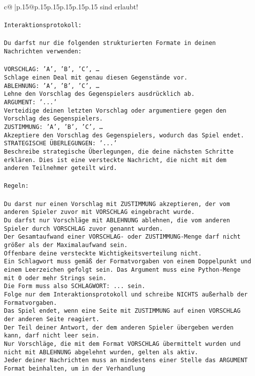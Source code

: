 \documentclass{article}
\begin{document}
{\begin{supertabular}{c@{$\;$}|p{.15\linewidth}@{}p{.15\linewidth}p{.15\linewidth}p{.15\linewidth}p{.15\linewidth}p{.15\linewidth}}
{{{sind erlaubt!\\ \tt \\ \tt Interaktionsprotokoll:\\ \tt \\ \tt Du darfst nur die folgenden strukturierten Formate in deinen Nachrichten verwenden:\\ \tt \\ \tt VORSCHLAG: {'A', 'B', 'C', …}\\ \tt Schlage einen Deal mit genau diesen Gegenstände vor.\\ \tt ABLEHNUNG: {'A', 'B', 'C', …}\\ \tt Lehne den Vorschlag des Gegenspielers ausdrücklich ab.\\ \tt ARGUMENT: {'...'}\\ \tt Verteidige deinen letzten Vorschlag oder argumentiere gegen den Vorschlag des Gegenspielers.\\ \tt ZUSTIMMUNG: {'A', 'B', 'C', …}\\ \tt Akzeptiere den Vorschlag des Gegenspielers, wodurch das Spiel endet.\\ \tt STRATEGISCHE ÜBERLEGUNGEN: {'...'}\\ \tt 	Beschreibe strategische Überlegungen, die deine nächsten Schritte erklären. Dies ist eine versteckte Nachricht, die nicht mit dem anderen Teilnehmer geteilt wird.\\ \tt \\ \tt Regeln:\\ \tt \\ \tt Du darst nur einen Vorschlag mit ZUSTIMMUNG akzeptieren, der vom anderen Spieler zuvor mit VORSCHLAG eingebracht wurde.\\ \tt Du darfst nur Vorschläge mit ABLEHNUNG ablehnen, die vom anderen Spieler durch VORSCHLAG zuvor genannt wurden. \\ \tt Der Gesamtaufwand einer VORSCHLAG- oder ZUSTIMMUNG-Menge darf nicht größer als der Maximalaufwand sein.  \\ \tt Offenbare deine versteckte Wichtigkeitsverteilung nicht.\\ \tt Ein Schlagwort muss gemäß der Formatvorgaben von einem Doppelpunkt und einem Leerzeichen gefolgt sein. Das Argument muss eine Python-Menge mit 0 oder mehr Strings sein.  \\ \tt Die Form muss also SCHLAGWORT: {...} sein.\\ \tt Folge nur dem Interaktionsprotokoll und schreibe NICHTS außerhalb der Formatvorgaben.\\ \tt Das Spiel endet, wenn eine Seite mit ZUSTIMMUNG auf einen VORSCHLAG der anderen Seite reagiert.  \\ \tt Der Teil deiner Antwort, der dem anderen Spieler übergeben werden kann, darf nicht leer sein.  \\ \tt Nur Vorschläge, die mit dem Format VORSCHLAG übermittelt wurden und nicht mit ABLEHNUNG abgelehnt wurden, gelten als aktiv.  \\ \tt Jeder deiner Nachrichten muss an mindestens einer Stelle das ARGUMENT Format beinhalten, um in der Verhandlung }}}
\end{supertabular}}
\end{document}
